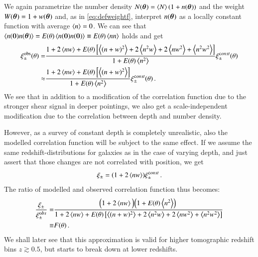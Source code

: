 We again parametrize the number density $N(\bm{\theta})=\left< N \right> (1+n(\bm{\theta}))$ and the weight $W(\bm{\theta})=1+w(\bm{\theta})$ and, as in \eqref{eq:defweightf}, interpret $n(\bm{\theta})$ as a locally constant function with average $\left< n \right> = 0$. We can see that $\left< n(\bm{0})n(\bm{\theta})\right> = E(\theta)\left< n(\bm{0})n(\bm{0})\right> \equiv E(\theta)\left< n n \right>$ holds and get
 \begin{align}
\xi^{\text{obs}}_\pm(\theta) = & \frac{1 + 2\left< nw \right> + E(\theta)\left[\left< (n+w)^2\right> + 2 \left< n^2 w\right> + 2\left< nw^2\right> + \left< n^2 w^2\right> \right]}{1+E(\theta)\left< n^2\right> }\xi_\pm^{\mathrm const}(\theta) \\
\approx & \frac{1 + 2\left< nw \right> + E(\theta)\left[\left< (n+w)^2\right> \right]}{1+E(\theta)\left< n^2\right> }\xi_\pm^{\mathrm const}(\theta)\, . \nonumber
 \label{eq:ffunct}
\end{align}
We see that in addition to a modification of the correlation function due to the stronger shear signal in deeper pointings, we also get a scale-independent modification due to the correlation between depth and number density.

However, as a survey of constant depth is completely unrealistic, also the modelled correlation function will be subject to the same effect. If we assume the same redshift-distributions for galaxies as in the case of varying depth, and just assert that those changes are not correlated with position, we get 
\begin{equation}
\xi_\pm = (1+2\left< nw\right>)\xi_\pm^{\mathrm const}\, .
\end{equation}
The ratio of modelled and observed correlation function thus becomes: \begin{align}
\frac{\xi_\pm}{\xi_\pm^{\mathrm obs}} = & \frac{\left(1+2\left< nw\right>\left)\left(1+E(\theta)\left< n^2\right>\right)\right.\right.}{1 + 2\left< nw \right> + E(\theta)\left[\left< (n+w)^2\right> + 2 \left< n^2 w\right> + 2\left< nw^2\right> + \left< n^2 w^2\right> \right]} \\
\equiv & F(\theta) \, .
\end{align}
We shall later see that this approximation is valid for higher tomographic redshift bins $z\gtrsim 0.5$, but starts to break down at lower redshifts. 
